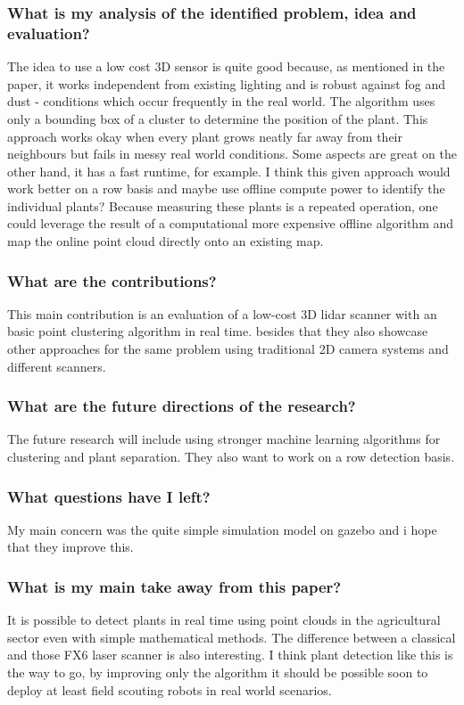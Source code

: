 \subsubsection*{What is my analysis of the identified problem, idea and evaluation?}
The idea to use a low cost 3D sensor is quite good because, as mentioned in the paper, it works independent from 
existing lighting and is robust against fog and dust - conditions which occur frequently in the real world.
The algorithm uses only a bounding box of a cluster to determine the position of the plant. This approach works okay 
when every plant grows neatly far away from their neighbours but fails in messy real world conditions.
Some aspects are great on the other hand, it has a fast runtime, for example. I think this given approach would work 
better on a row basis and maybe use offline compute power to identify the individual plants? 
Because measuring these plants is a repeated operation, one could leverage the result of a computational more expensive
offline algorithm and map the online point cloud directly onto an existing map.
\subsubsection*{What are the contributions?}
This main contribution is an evaluation of a low-cost 3D lidar scanner with an basic point clustering algorithm in real time. besides
that they also showcase other approaches for the same problem using traditional 2D camera systems and different scanners.

\subsubsection*{What are the future directions of the research?}
The future research will include using stronger machine learning algorithms for clustering and plant separation. They also
want to work on a row detection basis.
\subsubsection*{What questions have I left?}
My main concern was the quite simple simulation model on gazebo and i hope that they improve this.
\subsubsection*{What is my main take away from this paper?}
It is possible to detect plants in real time using point clouds in the agricultural sector even with 
simple mathematical methods. The difference between a classical and those FX6 laser scanner is also interesting.
I think plant detection like this is the way to go, by improving only the algorithm it should be possible
soon to deploy at least field scouting robots in real world scenarios. 

